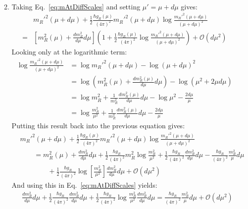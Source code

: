 \documentclass[12pt,a4]{article}
\begin{document}
\begin{enumerate}
\begin{enumerate}
\begin{align*}
        \end{align*}
      \item
        Taking Eq.~\ref{eq:mAtDiffScales} and setting $\mu' = \mu + d \mu$ gives:
        \begin{align*}
            & m_R'^2(\mu + d \mu) + \frac{1}{2}\frac{\hbar g_R(\mu)}{(4\pi)^2}  m_R'^2(\mu + d \mu) \log \frac{m_R'^2(\mu + d \mu)}{(\mu + d \mu)^2}\\
          = &\left[ m_R^2(\mu) + \frac{d m_R^2}{d \mu} d \mu\right]\left(1 + \frac{1}{2}\frac{\hbar g_R(\mu)}{(4\pi)^2} \log \frac{m_R'^2(\mu + d \mu)}{(\mu + d \mu)^2}\right) + \mathcal{O}(d \mu^2)
        \end{align*}
        Looking only at the logarithmic term:
        \begin{align*}
          \log \frac{m_R'^2(\mu + d \mu)}{(\mu + d \mu)^2} &= \log m_R'^2(\mu + d \mu) - \log (\mu + d \mu)^2\\
                                                           &= \log \left(m_R^2(\mu) + \frac{d m_R^2(\mu)}{d \mu} d \mu\right) - \log (\mu^2 + 2 \mu d \mu)\\
                                                           &= \log m_R^2 + \frac{1}{m_R^2}\frac{d m_R^2(\mu)}{d \mu} d \mu - \log \mu^2 - \frac{2 d \mu}{\mu}\\
                                                           &= \log \frac{m_R^2}{\mu^2} + \frac{1}{m_R^2}\frac{d m_R^2(\mu)}{d \mu} d \mu - \frac{2 d \mu}{\mu}
        \end{align*}
        Putting this result back into the previous equation gives:
        \begin{align*}
          &   m_R'^2(\mu + d \mu) + \frac{1}{2}\frac{\hbar g_R(\mu)}{(4\pi)^2}  m_R'^2(\mu + d \mu) \log \frac{m_R'^2(\mu + d \mu)}{(\mu + d \mu)^2}\\
          &\qquad =  m_R^2(\mu) + \frac{d m_R^2}{d \mu} d \mu + \frac{1}{2}\frac{\hbar g_R}{(4\pi)^2} m_R^2 \log \frac{m_R^2}{\mu^2} + \frac{1}{2}\frac{\hbar g_R}{(4\pi)^2} \frac{d m_R^2}{d \mu} d \mu  - \frac{\hbar g_R}{(4\pi)^2} \frac{m_R^2}{\mu}d\mu\\
          & \qquad \qquad + \frac{1}{2}\frac{\hbar g_R}{(4\pi)^2} \log \left[\frac{m_R^2}{\mu^2}\right] \frac{d m_R^2}{d \mu} d \mu + \mathcal{O}(d \mu^2)
        \end{align*}
        And using this in Eq.~\ref{eq:mAtDiffScales} yields:
        \begin{align*}
                      & \frac{d m_R^2}{d \mu} d \mu + \frac{1}{2}\frac{\hbar g_R}{(4\pi)^2} \frac{d m_R^2}{d \mu} d \mu + \frac{1}{2}\frac{\hbar g_R}{(4\pi)^2} \log \frac{m_R^2}{\mu^2} \frac{d m_R^2}{d \mu} d \mu = \frac{\hbar g_R}{(4\pi)^2} \frac{m_R^2}{\mu} d \mu+ \mathcal{O}(d \mu^2)\\

\end{align*}
\end{enumerate}
\end{enumerate}
\end{document}
